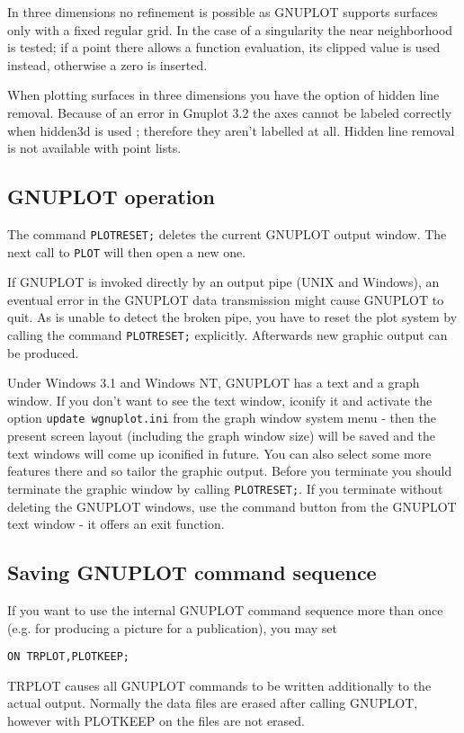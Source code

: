 In three dimensions no refinement is possible as 
GNUPLOT supports surfaces
only with a fixed regular grid. In the case
of a singularity the near neighborhood is
tested; if a point there allows a function evaluation, its 
clipped value is used instead, otherwise a zero is inserted.

When plotting surfaces in three dimensions you have the
option of hidden line removal. Because of an error in
Gnuplot 3.2 the axes cannot be labeled
correctly when hidden3d is used ; therefore they aren't labelled at all. Hidden line
removal is not available with point lists.


\subsection{GNUPLOT operation}

The command \verb+PLOTRESET;+ deletes the current GNUPLOT output
window. The next call to \verb+PLOT+ will then open a new one.

If GNUPLOT is invoked directly by an output pipe (UNIX and Windows),
an eventual error in the GNUPLOT data transmission might cause GNUPLOT to
quit. As {\REDUCE} is unable to detect the broken pipe, you
have to reset the plot system by calling the 
command \verb+PLOTRESET;+ explicitly. Afterwards new graphic output
can be produced. 

Under Windows 3.1 and Windows NT, GNUPLOT has a text and a graph window.
If you don't want to see the text window, iconify it and
activate the option \verb+update wgnuplot.ini+ from the
graph window system menu - then the present screen layout
(including the graph window size) will be saved and the text
windows will come up iconified in future. You can also select 
some more features there and so tailor the graphic output.
Before you terminate {\REDUCE} you should terminate the
graphic window by calling \verb+PLOTRESET;+.
If you terminate {\REDUCE} without deleting the
GNUPLOT windows, use the command button from the
GNUPLOT text window - it offers an exit function.

\subsection{Saving GNUPLOT command sequence}

If you want to use the internal GNUPLOT command sequence
more than once (e.g. for producing a picture for a publication),
you may set 
\begin{verbatim}
ON TRPLOT,PLOTKEEP;
\end{verbatim}
TRPLOT causes all GNUPLOT commands
to be written additionally to the actual
{\REDUCE} output. Normally the data files are
erased after calling GNUPLOT, however with PLOTKEEP on
the files are not erased.

